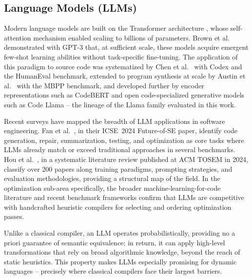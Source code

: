 \documentclass[conference]{IEEEtran}
\begin{document}
\subsection{Language Models (LLMs)}
Modern language models are built on the Transformer architecture \cite{DBLP:conf/nips/VaswaniSPUJGKP17}, whose self-attention mechanism enabled scaling to billions of parameters. Brown et al.~\cite{DBLP:conf/nips/Brown0MRSKDNSSAA20} demonstrated with GPT-3 that, at sufficient scale, these models acquire emergent few-shot learning abilities without task-specific fine-tuning. The application of this paradigm to source code was systematized by Chen et al.~\cite{DBLP:journals/corr/abs-2107-03374} with Codex and the HumanEval benchmark, extended to program synthesis at scale by Austin et al.~\cite{DBLP:journals/corr/abs-2108-07732} with the MBPP benchmark, and developed further by encoder representations such as CodeBERT \cite{DBLP:conf/emnlp/FengGTDFGS0LJZ20} and open code-specialized generative models such as Code Llama \cite{DBLP:journals/corr/abs-2308-12950} -- the lineage of the Llama family evaluated in this work.

Recent surveys have mapped the breadth of LLM applications in software engineering. Fan et al.~\cite{DBLP:conf/icse/FanGHLSYZ24}, in their ICSE~2024 Future-of-SE paper, identify code generation, repair, summarization, testing, and optimization as core tasks where LLMs already match or exceed traditional approaches in several benchmarks. Hou et al.~\cite{DBLP:journals/tosem/HouZLYWLLLGW24}, in a systematic literature review published at ACM TOSEM in 2024, classify over 200 papers along training paradigms, prompting strategies, and evaluation methodologies, providing a structural map of the field. In the optimization sub-area specifically, the broader machine-learning-for-code literature \cite{DBLP:journals/csur/AllamanisBDS18} and recent benchmark frameworks \cite{DBLP:journals/corr/abs-2407-02524} confirm that LLMs are competitive with handcrafted heuristic compilers for selecting and ordering optimization passes.

Unlike a classical compiler, an LLM operates probabilistically, providing no a priori guarantee of semantic equivalence; in return, it can apply high-level transformations that rely on broad algorithmic knowledge, beyond the reach of static heuristics. This property makes LLMs especially promising for dynamic languages -- precisely where classical compilers face their largest barriers.
\end{document}
